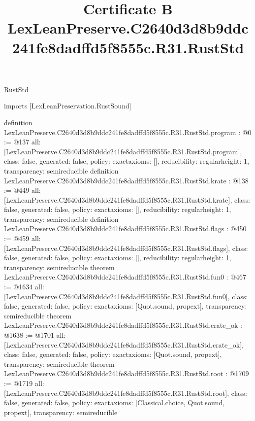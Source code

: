 \begin{lexlean}{RustStd}
\title{Certificate B LexLeanPreserve.C2640d3d8b9ddc241fe8dadffd5f8555c.R31.RustStd}
\begin{coremodule}
imports [LexLeanPreservation.RustSound]

definition LexLeanPreserve.C2640d3d8b9ddc241fe8dadffd5f8555c.R31.RustStd.program : @0 := @137 {
  all: [LexLeanPreserve.C2640d3d8b9ddc241fe8dadffd5f8555c.R31.RustStd.program],
  class: false,
  generated: false,
  policy: exact{axioms: []},
  reducibility: regular{height: 1},
  transparency: semireducible
}
definition LexLeanPreserve.C2640d3d8b9ddc241fe8dadffd5f8555c.R31.RustStd.krate : @138 := @449 {
  all: [LexLeanPreserve.C2640d3d8b9ddc241fe8dadffd5f8555c.R31.RustStd.krate],
  class: false,
  generated: false,
  policy: exact{axioms: []},
  reducibility: regular{height: 1},
  transparency: semireducible
}
definition LexLeanPreserve.C2640d3d8b9ddc241fe8dadffd5f8555c.R31.RustStd.flags : @450 := @459 {
  all: [LexLeanPreserve.C2640d3d8b9ddc241fe8dadffd5f8555c.R31.RustStd.flags],
  class: false,
  generated: false,
  policy: exact{axioms: []},
  reducibility: regular{height: 1},
  transparency: semireducible
}
theorem LexLeanPreserve.C2640d3d8b9ddc241fe8dadffd5f8555c.R31.RustStd.fun0 : @467 := @1634 {
  all: [LexLeanPreserve.C2640d3d8b9ddc241fe8dadffd5f8555c.R31.RustStd.fun0],
  class: false,
  generated: false,
  policy: exact{axioms: [Quot.sound, propext]},
  transparency: semireducible
}
theorem LexLeanPreserve.C2640d3d8b9ddc241fe8dadffd5f8555c.R31.RustStd.crate_ok : @1638 := @1701 {
  all: [LexLeanPreserve.C2640d3d8b9ddc241fe8dadffd5f8555c.R31.RustStd.crate_ok],
  class: false,
  generated: false,
  policy: exact{axioms: [Quot.sound, propext]},
  transparency: semireducible
}
theorem LexLeanPreserve.C2640d3d8b9ddc241fe8dadffd5f8555c.R31.RustStd.root : @1709 := @1719 {
  all: [LexLeanPreserve.C2640d3d8b9ddc241fe8dadffd5f8555c.R31.RustStd.root],
  class: false,
  generated: false,
  policy: exact{axioms: [Classical.choice, Quot.sound, propext]},
  transparency: semireducible
}


\end{coremodule}
\end{lexlean}
